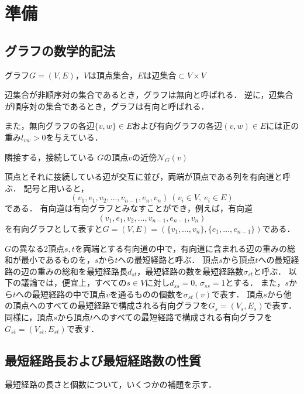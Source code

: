 \chapter{準備}

\section{グラフの数学的記法}

グラフ$G=(V,E)$，$V$は頂点集合，$E$は辺集合$\subset V\times V$

辺集合が非順序対の集合であるとき，グラフは無向と呼ばれる．
逆に，辺集合が順序対の集合であるとき，グラフは有向と呼ばれる．

また，無向グラフの各辺$\{v,w\}\in E$および有向グラフの各辺$(v,w)\in E$には正の重み$l_{vw}>0$を与えている．

隣接する，接続している
$G$の頂点$v$の近傍$\mathcal{N}_G(v)$

頂点とそれに接続している辺が交互に並び，両端が頂点である列を有向道と呼ぶ．
記号と用いると，
\[ (v_1,e_1,v_2,\ldots,v_{n-1},e_n,v_n)\ (v_i\in V,\ e_i\in E) \]
である．
有向道は有向グラフとみなすことができ，例えば，有向道
\[ (v_1,e_1,v_2,\ldots,v_{n-1},e_{n-1},v_n) \]
を有向グラフとして表すと$G=(V,E)=(\{v_1,\ldots,v_n\},\{e_1,\ldots,e_{n-1}\})$である．

$G$の異なる2頂点$s,t$を両端とする有向道の中で，有向道に含まれる辺の重みの総和が最小であるものを，$s$から$t$への最短経路と呼ぶ．
頂点$s$から頂点$t$への最短経路の辺の重みの総和を最短経路長$d_{st}$，最短経路の数を最短経路数$\sigma_{st}$と呼ぶ．
以下の議論では，便宜上，すべての$s\in V$に対し$d_{ss}=0$, $\sigma_{ss}=1$とする．
また，$s$から$t$への最短経路の中で頂点$v$を通るものの個数を$\sigma_{st}(v)$で表す．
頂点$s$から他の頂点へのすべての最短経路で構成される有向グラフを$G_s=(V_s,E_s)$で表す．
同様に，頂点$s$から頂点$t$へのすべての最短経路で構成される有向グラフを$G_{st}=(V_{st},E_{st})$で表す．

\section{最短経路長および最短経路数の性質}

最短経路の長さと個数について，いくつかの補題を示す．

